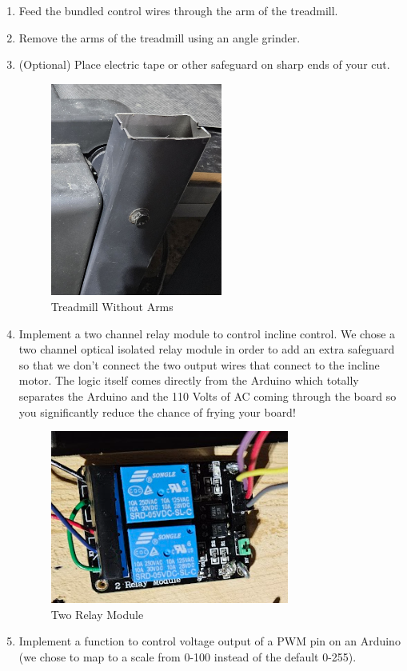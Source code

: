 \documentclass[journal]{IEEEtran}
\begin{document}
\begin{enumerate}
\item Feed the bundled control wires through the arm of the treadmill.
\item Remove the arms of the treadmill using an angle grinder.
\item (Optional) Place electric tape or other safeguard on sharp ends of your cut.
    \begin{figure}[H]
            \centering
            \includegraphics[height=70mm,width=0.5\linewidth]{Treadmill_Without_Arms.jpg}
            \caption{Treadmill Without Arms}
            \label{fig:3}
    \end{figure}
\item Implement a two channel relay module to control incline control. We chose a two channel optical isolated relay module in order to add an extra safeguard so that we don't connect the two output wires that connect to the incline motor. The logic itself comes directly from the Arduino which totally separates the Arduino and the 110 Volts of AC coming through the board so you significantly reduce the chance of frying your board!
    \begin{figure}[H]
            \centering
            \includegraphics[width=0.5\linewidth]{Two_Relay_Module.png}
            \caption{Two Relay Module}
            \label{fig:4}
    \end{figure}
\pagebreak
\item Implement a function to control voltage output of a PWM pin on an Arduino (we chose to map to a scale from 0-100 instead of the default 0-255).

\end{enumerate}
\end{document}
